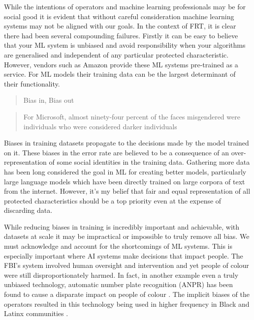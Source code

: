 \documentclass[]{final_report}
\begin{document}
While the intentions of operators and machine learning professionals may be for social good it is evident that without careful consideration machine learning systems may not be aligned with our goals\cite{AIAllignemnt}. In the context of FRT, it is clear there had been several compounding failures. Firstly it can be easy to believe that your ML system is unbiased and avoid responsibility when your algorithms are generalised and independent of any particular protected characteristic. However, vendors such as Amazon provide these ML systems pre-trained as a service. For ML models their training data can be the largest determinant of their functionality. 

\begin{quote}
  Bias in, Bias out \cite{facialRecognitionBias}
\end{quote}

\begin{quote}
  For Microsoft, almost ninety-four percent of
the faces misgendered were individuals who were considered darker individuals\cite{facialRecognitionBias}
\end{quote} 

Biases in training datasets propagate to the decisions made by the model trained on it. These biases in the error rate are believed to be a consequence of an over-representation of some social identities in the training data\cite{LLMSocialEthicalRisks}. Gathering more data has been long considered the goal in ML for creating better models, particularly large language models which have been directly trained on large corpora of text from the internet\cite{LLMSocialEthicalRisks}. However, it's my belief that fair and equal representation of all protected characteristics should be a top priority even at the expense of discarding data.

\newpage
While reducing biases in training is incredibly important and achievable, with datasets at scale it may be impractical or impossible to truly remove all bias. We must acknowledge and account for the shortcomings of ML systems. This is especially important where AI systems make decisions that impact people. The FBI's system involved human oversight and intervention and yet people of colour were still disproportionately harmed. In fact, in another example even a truly unbiased technology, automatic number plate recognition (ANPR) has been found to cause a disparate impact on people of colour \cite{anprAccountability}. The implicit biases of the operators resulted in this technology being used in higher frequency in Black and Latinx communities \cite{anprAccountability}\cite{facialRecognitionBias}.
\end{document}
